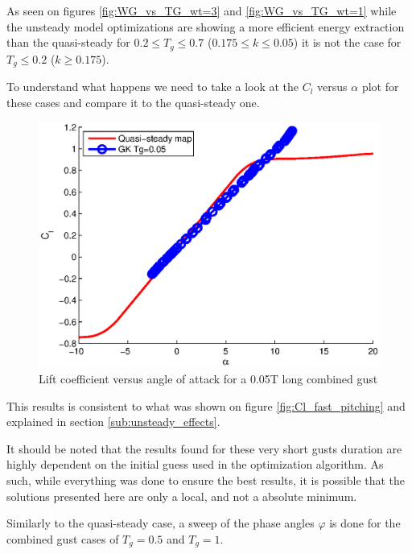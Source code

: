 \par As seen on figures \ref{fig:WG_vs_TG_wt=3} and \ref{fig:WG_vs_TG_wt=1} while the unsteady model optimizations are showing a more efficient energy extraction than the quasi-steady for $0.2 \leq T_g \leq 0.7$ ($0.175 \leq k \leq 0.05$) it is not the case for $T_g \le 0.2$ ($k\ge 0.175$). 

To understand what happens we need to take a look at the $C_l$ versus $\alpha$ plot for these cases and compare it to the quasi-steady one.

\begin{figure}[h]
  \centering
  \includegraphics{./Figures/Cl_vs_alpha_Windtype=3_Tg=0p05_GK_alphamax=12.eps}
  \caption{Lift coefficient versus angle of attack for a 0.05T long combined gust}
  \label{fig:Cl_vs_alpha_Windtype=3_Tg=0p05_GK_alphamax=12}
\end{figure}

\FloatBarrier

\par This results is consistent to what was shown on figure \ref{fig:Cl_fast_pitching} and explained in section \ref{sub:unsteady_effects}.

\par It should be noted that the results found for these very short gusts duration are highly dependent on the initial guess used in the optimization algorithm.
As such, while everything was done to ensure the best results, it is possible that the solutions presented here are only a local, and not a absolute minimum.

Similarly to the quasi-steady case, a sweep of the phase angles $\varphi$ is done for the combined gust cases of $T_g=0.5$ and $T_g=1$.

